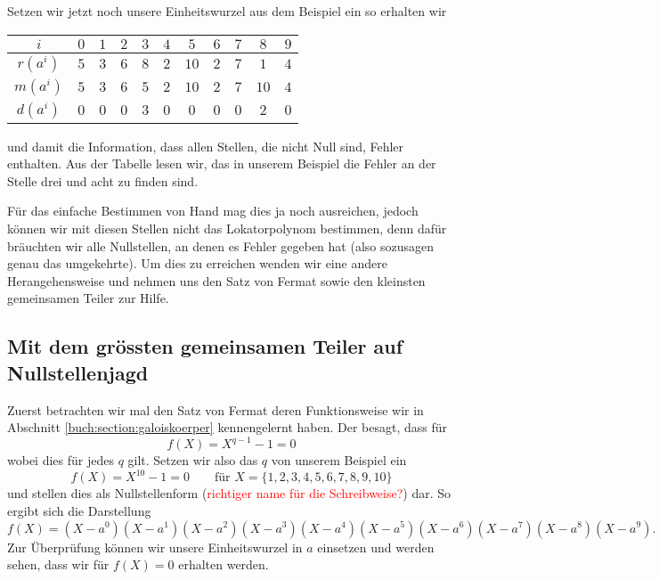 Setzen wir jetzt noch unsere Einheitswurzel aus dem Beispiel ein so erhalten wir
\begin{center}
\begin{tabular}{c c c c c c c c c c c}
	\hline
	$i$& $0$& $1$& $2$& $3$& $4$& $5$& $6$& $7$& $8$& $9$\\
	\hline
	$r(a^{i})$& $5$& $3$& $6$& $8$& $2$& $10$& $2$& $7$& $1$& $4$\\
	$m(a^{i})$& $5$& $3$& $6$& $5$& $2$& $10$& $2$& $7$& $10$& $4$\\
	$d(a^{i})$& $0$& $0$& $0$& $3$& $0$& $0$& $0$& $0$& $2$& $0$\\
	\hline
\end{tabular}
\end{center}
und damit die Information, dass allen Stellen, die nicht Null sind, Fehler enthalten. 
Aus der Tabelle lesen wir, das in unserem Beispiel die Fehler an der Stelle drei und acht zu finden sind.

Für das einfache Bestimmen von Hand mag dies ja noch ausreichen, jedoch können wir mit diesen Stellen nicht das Lokatorpolynom bestimmen, denn dafür bräuchten wir alle Nullstellen, an denen es Fehler gegeben hat (also sozusagen genau das umgekehrte). Um dies zu erreichen wenden wir eine andere Herangehensweise und nehmen uns den Satz von Fermat sowie den kleinsten gemeinsamen Teiler zur Hilfe.

\subsection{Mit dem grössten gemeinsamen Teiler auf Nullstellenjagd
\label{reedsolomon:subsection:ggT}}

Zuerst betrachten wir mal den Satz von Fermat deren Funktionsweise wir in Abschnitt \ref{buch:section:galoiskoerper} kennengelernt haben. Der besagt, dass für
\[
f(X) = X^{q-1} -1 = 0
\] 
wobei dies für jedes $q$ gilt. Setzen wir also das $q$ von unserem Beispiel ein
\[
f(X) = X^{10}-1 = 0 \qquad \text{für } X = \{1,2,3,4,5,6,7,8,9,10\}
\]
und stellen dies als Nullstellenform (\textcolor{red}{richtiger name für die Schreibweise?}) dar. So ergibt sich die Darstellung 
\[
f(X) = (X-a^0)(X-a^1)(X-a^2)(X-a^3)(X-a^4)(X-a^5)(X-a^6)(X-a^7)(X-a^8)(X-a^9).
\]
Zur Überprüfung können wir unsere Einheitswurzel in $a$ einsetzen und werden sehen, dass wir für $f(X) = 0$ erhalten werden.


